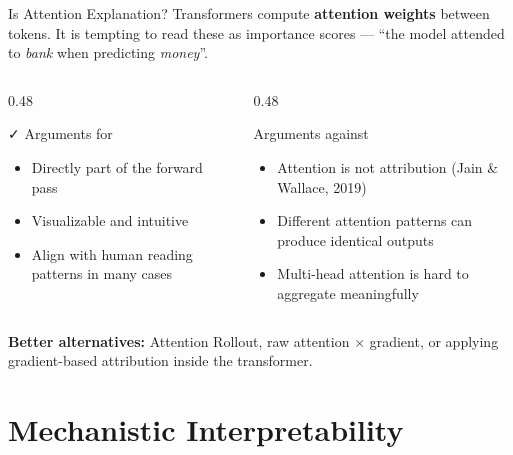 \documentclass[aspectratio=169]{beamer}
\begin{document}
\begin{frame}{Is Attention Explanation?}
  Transformers compute \textbf{attention weights} between tokens.
  It is tempting to read these as importance scores — ``the model attended to
  \emph{bank} when predicting \emph{money}''.

  \vspace{0.7em}
  \begin{columns}[T]
    \begin{column}{0.48\textwidth}
      \begin{exampleblock}{\faCheck\; Arguments for}
        \begin{itemize}
          \item Directly part of the forward pass
          \item Visualizable and intuitive
          \item Align with human reading patterns in many cases
        \end{itemize}
      \end{exampleblock}
    \end{column}
    \begin{column}{0.48\textwidth}
      \begin{alertblock}{\faTimes\; Arguments against}
        \begin{itemize}
          \item Attention is not attribution (Jain \& Wallace, 2019)
          \item Different attention patterns can produce identical outputs
          \item Multi-head attention is hard to aggregate meaningfully
        \end{itemize}
      \end{alertblock}
    \end{column}
  \end{columns}

  \vspace{0.7em}
  \textbf{Better alternatives:} Attention Rollout, raw attention $\times$ gradient,
  or applying gradient-based attribution inside the transformer.
\end{frame}

\section{Mechanistic Interpretability}
\end{document}
